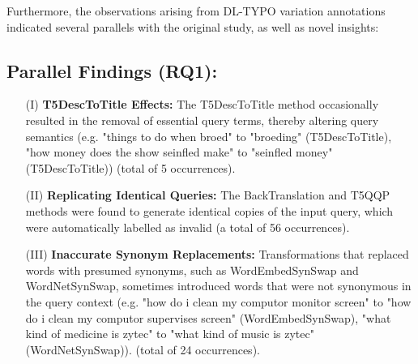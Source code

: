 Furthermore, the observations arising from DL-TYPO variation annotations indicated several parallels with the original study, as well as novel insights:

\subsection{Parallel Findings (RQ1):}
\begin{itemize}
    \item[(I)] \textbf{T5DescToTitle Effects:} The T5DescToTitle method occasionally resulted in the removal of essential query terms, thereby altering query semantics (e.g. "things to do when broed" to "broeding" (T5DescToTitle), "how money does the show seinfled make" to "seinfled money" (T5DescToTitle)) (total of 5 occurrences).
    \item[(II)] \textbf{Replicating Identical Queries:} The BackTranslation and T5QQP methods were found to generate identical copies of the input query, which were automatically labelled as invalid (a total of 56 occurrences).
    \item[(III)] \textbf{Inaccurate Synonym Replacements:} Transformations that replaced words with presumed synonyms, such as WordEmbedSynSwap and WordNetSynSwap, sometimes introduced words that were not synonymous in the query context (e.g. "how do i clean my computor monitor screen" to "how do i clean my computor supervises screen" (WordEmbedSynSwap), "what kind of medicine is zytec" to "what kind of music is zytec" (WordNetSynSwap)). (total of 24 occurrences).
\end{itemize}
